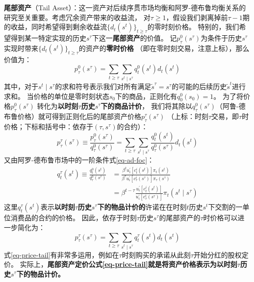 \begin{example}
    \textbf{尾部资产}（Tail Asset）：这一资产对后续序贯市场均衡和阿罗-德布鲁均衡关系的研究至关重要。考虑冗余资产带来的收益流，
    对$\tau \geq 1$，假设我们剥离掉前$\tau-1$期的收益，同时希望得到剩余收益流$\{d_t\left(s^t\right)\}_{t\geq \tau}$的零时刻价格。
    特别的，我们希望得到某一特定实现的历史$s^\tau$下这一\textbf{尾部资产}的价值。
    记$p_{\tau}^0\left(s^\tau\right)$为条件于历史$s^{\tau}$实现时带来$\{d_t\left(s^t\right)\}_{t\geq \tau}$的资产的\textbf{零时价格}
    （即在零时刻交易，注意上标），那么价值为：
    \begin{equation}
        p_\tau^0\left(s^\tau\right)=\sum_{t \geq \tau} \sum_{s^t \mid s^\tau} q_t^0\left(s^t\right) d_t\left(s^t\right)
    \end{equation}
    其中，对于$s^t\mid s^{\tau}$的求和符号表示我们对所有满足$\tilde{s}^{\tau}=s^{\tau}$的可能的后续历史$\tilde{s}^t$进行求和。
    当价格的单位是零时刻状态$s_0$下的商品，正则化有$q_0^0\left(s_0\right)=1$。
    为了将价格$p_\tau^0\left(s^\tau\right)$ 转化为\textbf{以时刻$\tau$历史$s^{\tau}$下的商品计价}，
    我们将其除以$q_{\tau}^0\left(s^{\tau}\right)$（阿鲁-德布鲁价格）就可得到正则化后的尾部资产价格$p_\tau^\tau\left(s^\tau\right)$
    （上标：时刻$\tau$交易，即$\tau$时价格；下标和括号中：依存于$(\tau,s^{\tau})$的合约）：
    \begin{equation}
        p_\tau^\tau\left(s^\tau\right) \equiv \frac{p_\tau^0\left(s^\tau\right)}{q_\tau^0\left(s^\tau\right)}
            =\sum_{t \geq \tau} \sum_{s^t \mid s^\tau} \frac{q_t^0\left(s^t\right)}{q_\tau^0\left(s^\tau\right)} d_t\left(s^t\right)
    \end{equation}
    又由阿罗-德布鲁市场中的一阶条件式\ref{eq-ad-foc}：
    \begin{equation}
        \begin{aligned}
            q_t^\tau\left(s^t\right) 
                \equiv \frac{q_t^0\left(s^t\right)}{q_\tau^0\left(s^\tau\right)} 
                & =\frac{\beta^t u_i^{\prime}\left[c_t^i\left(s^t\right)\right] \pi_t\left(s^t\right)}
                    {\beta^\tau u_i^{\prime}\left[c_\tau^i\left(s^\tau\right)\right] \pi_\tau\left(s^\tau\right)} \\
                & =\beta^{t-\tau} \frac{u_i^{\prime}\left[c_t^i\left(s^t\right)\right]}
                    {u_i^{\prime}\left[c_\tau^i\left(s^\tau\right)\right]} \pi_t\left(s^t \mid s^\tau\right)
            \end{aligned}
    \end{equation}
    这里$q_t^\tau\left(s^t\right)$表示\textbf{以时刻$\tau$历史$s^{\tau}$下的物品计价的}许诺在在时刻$t$历史$s^t$下交割的一单位消费品的合约的价格。
    因此，依存于时刻$\tau$历史$s^{\tau}$的尾部资产的$\tau$时价格可以进一步简化为：
    \begin{equation}    \label{eq-price-tail}
        p_\tau^\tau\left(s^\tau\right)=\sum_{t \geq \tau} \sum_{s^t \mid s^\tau} q_t^\tau\left(s^t\right) d_t\left(s^t\right)
    \end{equation}
    式\ref{eq-price-tail}有非常多运用，例如在$\tau$时刻购买的承诺从此刻$\tau$开始分红的股权定价。
    实际上，\textbf{尾部资产定价公式\ref{eq-price-tail}就是将资产价格表示为以时刻$\tau$历史$s^{\tau}$下的物品计价。}
\end{example}


